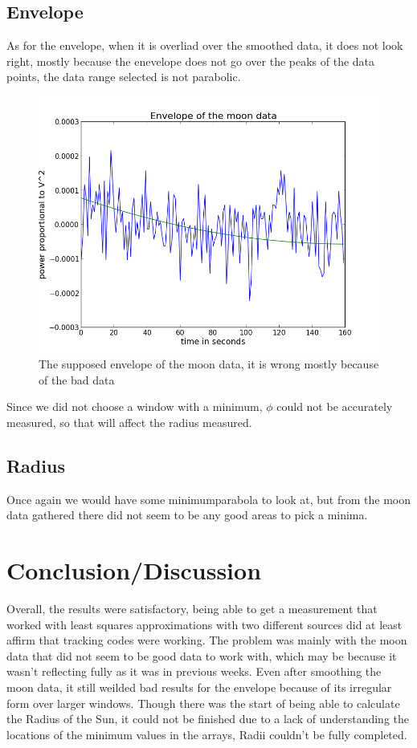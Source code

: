 \documentclass[12 pt]{article}
\begin{document}
\subsection*{Envelope}
As for the envelope, when it is overliad over the smoothed data, it
does not look right, mostly because the enevelope does not go over the
peaks of the data points, the data range selected is not parabolic. 
\begin{figure}[H]
\centering
\includegraphics[scale=0.5]{moonenvelope.png}
\caption{The supposed envelope of the moon data, it is wrong mostly
  because of the bad data}
\label{moonenvelope}
\end{figure}
Since we did not choose a window with a minimum, $\phi$ could not be
accurately measured, so that will affect the radius measured.

\subsection*{Radius}
Once again we would have some minimumparabola to look at,  but from the
moon data gathered there did not seem to be any good areas to pick a
minima. 

\section*{Conclusion/Discussion}
Overall, the results were satisfactory, being able to get a measurement
that worked with least squares approximations with two different
sources did at least affirm that tracking codes were working. The
problem was mainly with the moon data that did not seem to be good data
to work with, which may be because it wasn't reflecting fully as it was
in previous weeks. Even after smoothing the moon data,  it still weilded
bad results for the envelope because of its irregular form over larger
windows. Though there was the start of being able to calculate the
Radius of the Sun, it could not be finished due to a lack of
understanding the locations of the minimum values in the arrays, Radii
couldn't be fully completed. 
\end{document}
